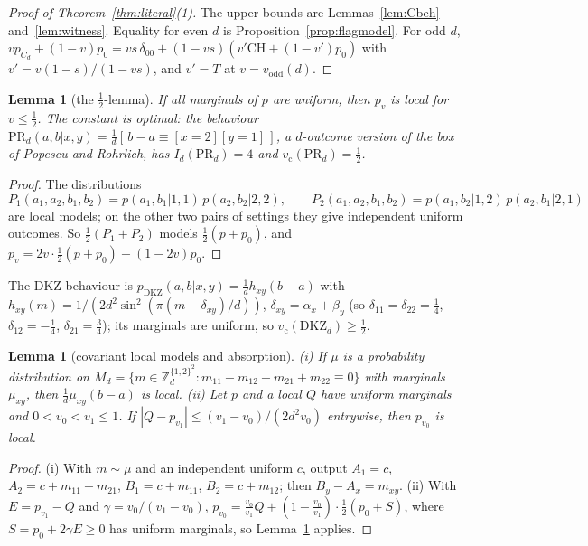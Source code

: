 \documentclass[11pt]{amsart}
\newtheorem{lemma}[theorem]{Lemma}
\theoremstyle{definition}
\theoremstyle{remark}
\numberwithin{equation}{section}
\newcommand{\Z}{\mathbb{Z}}
\newcommand{\vc}{v_{\mathrm c}}
\newcommand{\vodd}{v_{\mathrm{odd}}}
\newcommand{\CH}{\mathrm{CH}}
\newcommand{\DKZ}{\mathrm{DKZ}}
\begin{document}
\begin{proof}[Proof of Theorem~\ref{thm:literal}(1)]
The upper bounds are Lemmas~\ref{lem:Cbeh} and~\ref{lem:witness}. Equality for even $d$ is
Proposition~\ref{prop:flagmodel}. For odd $d$,
$vp_{C_d}+(1-v)p_0=vs\,\delta_{00}+(1-vs)(v'\CH+(1-v')p_0)$ with $v'=v(1-s)/(1-vs)$, and $v'=T$ at $v=\vodd(d)$.
\end{proof}

\begin{lemma}[the $\frac12$-lemma]\label{lem:half}
If all marginals of $p$ are uniform, then $p_v$ is local for $v\le\frac12$. The constant is optimal: the behaviour
$\mathrm{PR}_d(a,b|x,y)=\frac1d[\,b-a\equiv[x=2][y=1]\,]$, a $d$-outcome version of the box of Popescu and
Rohrlich\cite{PR}, has $I_d(\mathrm{PR}_d)=4$ and $\vc(\mathrm{PR}_d)=\frac12$.
\end{lemma}

\begin{proof}
The distributions
\[
P_1(a_1,a_2,b_1,b_2)=p(a_1,b_1|1,1)\,p(a_2,b_2|2,2),\qquad P_2(a_1,a_2,b_1,b_2)=p(a_1,b_2|1,2)\,p(a_2,b_1|2,1)
\]
are local models; on the other two pairs of settings they give independent uniform outcomes. So $\frac12(P_1+P_2)$
models $\frac12(p+p_0)$, and $p_v=2v\cdot\frac12(p+p_0)+(1-2v)p_0$.
\end{proof}

The DKZ behaviour is $p_{\DKZ}(a,b|x,y)=\frac1dh_{xy}(b-a)$ with
$h_{xy}(m)=1/(2d^2\sin^2(\pi(m-\delta_{xy})/d))$, $\delta_{xy}=\alpha_x+\beta_y$ (so $\delta_{11}=\delta_{22}=\frac14$,
$\delta_{12}=-\frac14$, $\delta_{21}=\frac34$); its marginals are uniform, so $\vc(\DKZ_d)\ge\frac12$.

\begin{lemma}[covariant local models and absorption]\label{lem:absorb}
(i) If $\mu$ is a probability distribution on $M_d=\{m\in\Z_d^{\{1,2\}^2}:m_{11}-m_{12}-m_{21}+m_{22}\equiv0\}$ with
marginals $\mu_{xy}$, then $\frac1d\mu_{xy}(b-a)$ is local. (ii) Let $p$ and a local $Q$ have uniform marginals and
$0<v_0<v_1\le1$. If $|Q-p_{v_1}|\le(v_1-v_0)/(2d^2v_0)$ entrywise, then $p_{v_0}$ is local.
\end{lemma}

\begin{proof}
(i) With $m\sim\mu$ and an independent uniform $c$, output $A_1=c$, $A_2=c+m_{11}-m_{21}$, $B_1=c+m_{11}$,
$B_2=c+m_{12}$; then $B_y-A_x=m_{xy}$. (ii) With $E=p_{v_1}-Q$ and $\gamma=v_0/(v_1-v_0)$,
$p_{v_0}=\frac{v_0}{v_1}Q+(1-\frac{v_0}{v_1})\cdot\frac12(p_0+S)$, where $S=p_0+2\gamma E\ge0$ has uniform marginals, so
Lemma~\ref{lem:half} applies.
\end{proof}
\end{document}
